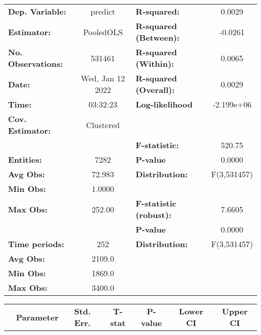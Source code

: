\begin{center}
\begin{tabular}{lclc}
\toprule
\textbf{Dep. Variable:}    &      predict       & \textbf{  R-squared:         }   &      0.0029      \\
\textbf{Estimator:}        &     PooledOLS      & \textbf{  R-squared (Between):}  &     -0.0261      \\
\textbf{No. Observations:} &       531461       & \textbf{  R-squared (Within):}   &      0.0065      \\
\textbf{Date:}             &  Wed, Jan 12 2022  & \textbf{  R-squared (Overall):}  &      0.0029      \\
\textbf{Time:}             &      03:32:23      & \textbf{  Log-likelihood     }   &    -2.199e+06    \\
\textbf{Cov. Estimator:}   &     Clustered      & \textbf{                     }   &                  \\
\textbf{}                  &                    & \textbf{  F-statistic:       }   &      520.75      \\
\textbf{Entities:}         &        7282        & \textbf{  P-value            }   &      0.0000      \\
\textbf{Avg Obs:}          &       72.983       & \textbf{  Distribution:      }   &   F(3,531457)    \\
\textbf{Min Obs:}          &       1.0000       & \textbf{                     }   &                  \\
\textbf{Max Obs:}          &       252.00       & \textbf{  F-statistic (robust):} &      7.6605      \\
\textbf{}                  &                    & \textbf{  P-value            }   &      0.0000      \\
\textbf{Time periods:}     &        252         & \textbf{  Distribution:      }   &   F(3,531457)    \\
\textbf{Avg Obs:}          &       2109.0       & \textbf{                     }   &                  \\
\textbf{Min Obs:}          &       1869.0       & \textbf{                     }   &                  \\
\textbf{Max Obs:}          &       3400.0       & \textbf{                     }   &                  \\
\bottomrule
\end{tabular}
\begin{tabular}{lcccccc}
                & \textbf{Parameter} & \textbf{Std. Err.} & \textbf{T-stat} & \textbf{P-value} & \textbf{Lower CI} & \textbf{Upper CI}  \\

\end{tabular}
\end{center}
